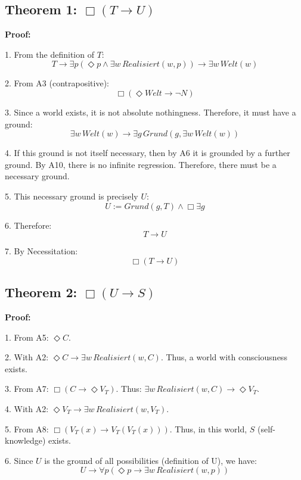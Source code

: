 \documentclass[
]{article}
\begin{document}
\subsection{Theorem 1: \(\Box(T \rightarrow U)\)}\label{theorem-1-boxt-rightarrow-u}

\textbf{Proof:}

1. From the definition of \(T\):  
   \[
   T \rightarrow \exists p(\Diamond p \land \exists w\, Realisiert(w,p)) \rightarrow \exists w\, Welt(w)
   \]

2. From A3 (contrapositive):  
   \[
   \Box(\Diamond Welt \rightarrow \neg N)
   \]

3. Since a world exists, it is not absolute nothingness. Therefore, it must have a ground:  
   \[
   \exists w\, Welt(w) \rightarrow \exists g\, Grund(g, \exists w\, Welt(w))
   \]

4. If this ground is not itself necessary, then by A6 it is grounded by a further ground. By A10, there is no infinite regression. Therefore, there must be a necessary ground.

5. This necessary ground is precisely \(U\):  
   \[
   U := Grund(g, T) \land \Box \exists g
   \]

6. Therefore:  
   \[
   T \rightarrow U
   \]

7. By Necessitation:  
   \[
   \boxed{\Box(T \rightarrow U)}
   \]

\subsection{Theorem 2: \(\Box(U \rightarrow S)\)}\label{theorem-2-boxu-rightarrow-s}

\textbf{Proof:}

1. From A5: \(\Diamond C\).

2. With A2: \(\Diamond C \rightarrow \exists w\, Realisiert(w,C)\).  
   Thus, a world with consciousness exists.

3. From A7: \(\Box(C \rightarrow \Diamond V_T)\).  
   Thus: \(\exists w\, Realisiert(w,C) \rightarrow \Diamond V_T\).

4. With A2: \(\Diamond V_T \rightarrow \exists w\, Realisiert(w,V_T)\).

5. From A8: \(\Box(V_T(x) \rightarrow V_T(V_T(x)))\).  
   Thus, in this world, \(S\) (self-knowledge) exists.

6. Since \(U\) is the ground of all possibilities (definition of U), we have:  
   \[
   U \rightarrow \forall p(\Diamond p \rightarrow \exists w\, Realisiert(w,p))
   \]
\end{document}
